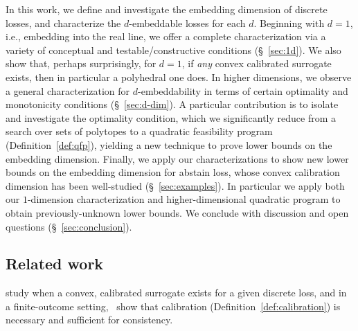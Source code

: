 \documentclass[anon]{colt2020} %
\newcommand{\reals}{\mathbb{R}}
\begin{document}
In this work, we define and investigate the embedding dimension of discrete losses, and characterize the $d$-embeddable losses for each $d$.
Beginning with $d=1$, i.e., embedding into the real line, we offer a complete characterization via a variety of conceptual and testable/constructive conditions (\S~\ref{sec:1d}).
We also show that, perhaps surprisingly, for $d=1$, if \emph{any} convex calibrated surrogate exists, then in particular a polyhedral one does.
In higher dimensions, we observe a general characterization for $d$-embeddability in terms of certain optimality and monotonicity conditions (\S~\ref{sec:d-dim}).
A particular contribution is to isolate and investigate the optimality condition, which we significantly reduce from a search over sets of polytopes to a quadratic feasibility program (Definition~\ref{def:qfp}), yielding a new technique to prove lower bounds on the embedding dimension.
Finally, we apply our characterizations to show new lower bounds on the embedding dimension for abstain loss, whose convex calibration dimension has been well-studied \citep{ramaswamy2016convex, ramaswamy2018consistent} (\S~\ref{sec:examples}).
In particular we apply both our $1$-dimension characterization and higher-dimensional quadratic program to obtain previously-unknown lower bounds.
We conclude with discussion and open questions (\S~\ref{sec:conclusion}).




\subsection{Related work}
\cite{bartlett2006convexity} study when a convex, calibrated surrogate exists for a given discrete loss, and in a finite-outcome setting,~\cite{tewari2007consistency} show that calibration (Definition~\ref{def:calibration}) is necessary and sufficient for consistency.
\end{document}

